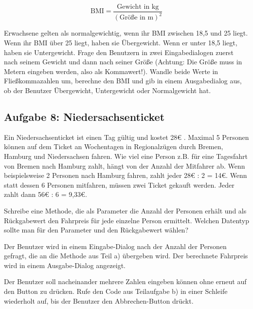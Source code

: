 $$
\textrm{BMI} = \frac{\textrm{Gewicht in kg}}{(\textrm{Größe in m})^2}
$$

Erwachsene gelten als normalgewichtig, wenn ihr BMI zwischen 18,5 und 25 liegt.
Wenn ihr BMI über 25 liegt, haben sie Übergewicht. Wenn er unter 18,5 liegt,
haben sie Untergewicht. Frage den Benutzern in zwei Eingabedialogen zuerst nach
seinem Gewicht und dann nach seiner Größe (Achtung: Die Größe muss in Metern
eingeben werden, also als Kommawert!). Wandle beide Werte in
Fließkommazahlen um, berechne den BMI und gib in einem Ausgabedialog aus, ob der Benutzer
Übergewicht, Untergewicht oder Normalgewicht hat.


\subsection{Aufgabe 8: Niedersachsenticket}

Ein Niedersachsenticket ist einen Tag gültig und kostet 28€ . Maximal 5 Personen
können auf dem Ticket an Wochentagen in Regionalzügen durch Bremen, Hamburg und
Niedersachsen fahren. Wie viel eine Person z.B. für eine Tagesfahrt von Bremen
nach Hamburg zahlt, hängt von der Anzahl der Mitfahrer ab. Wenn beispielsweise 2
Personen nach Hamburg fahren, zahlt jeder 28€ : 2 = 14€. Wenn statt dessen 6
Personen mitfahren, müssen zwei Ticket gekauft werden. Jeder zahlt dann 56€ : 6
= 9,33€.

\begin{compactenum}[a)]
\item Schreibe eine Methode, die als Parameter die Anzahl der Personen erhält
und als Rückgabewert den Fahrpreis für jede einzelne Person ermittelt. Welchen
Datentyp sollte man für den Parameter und den Rückgabewert wählen? 

\item Der Benutzer wird in einem Eingabe-Dialog nach der Anzahl der Personen
gefragt, die an die Methode aus Teil a) übergeben wird. Der berechnete
Fahrpreis wird in einem Ausgabe-Dialog angezeigt.

\item Der Benutzer soll nacheinander mehrere Zahlen eingeben können ohne erneut
auf den Button zu drücken. Rufe den Code aus Teilaufgabe b) in einer Schleife
wiederholt auf, bis der Benutzer den Abbrechen-Button drückt.
\end{compactenum}